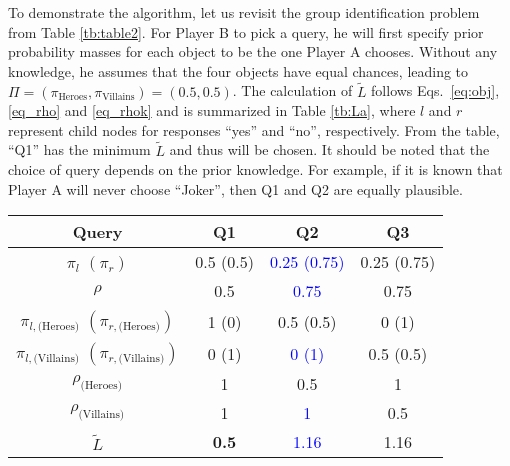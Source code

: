 \documentclass[onecolumn,11pt]{article}
\newcommand{\highlight}[1]{{\textcolor{blue}{{#1}}}}
\newcommand{\highlight}[1]{{{#1}}}
\newcommand{\cutsubsectionup}{\vspace*{-0.09in}}
\newcommand{\cutsubsectionup}{}
\begin{document}
To demonstrate the algorithm, let us revisit the group identification
problem from Table \ref{tb:table2}. For Player B to pick a query, he will first specify prior probability masses for each object to be the one Player A chooses.
Without any knowledge, he assumes that the four objects have equal chances, leading to $\Pi=(\pi_{\text{Heroes}},\pi_{\text{Villains}})=(0.5,0.5)$. The calculation of $\tilde{L}$ follows Eqs.~\eqref{eq:obj}, \eqref{eq_rho} and \eqref{eq_rhok} and is summarized in Table \ref{tb:La}, where $l$ and $r$ represent child nodes for responses ``yes'' and ``no'', respectively. From the table, ``Q1'' has the minimum $\tilde{L}$ and thus will be chosen. It should be noted that the choice of query depends on the prior knowledge. For example, if it is known that Player A will never choose ``Joker'', then Q1 and Q2 are equally plausible.
\begin{table*}[ht!]
\centering
\caption{Query selection for the case in Table \ref{tb:table2}} {\small
\begin{tabular*}{0.9\linewidth}{cccc}
\hline
Query & Q1 & Q2 & Q3 \\
\hline
$\pi_{l}$ $\left(\pi_{r}\right)$ & 0.5 (0.5) & \highlight{0.25 (0.75)} & 0.25 (0.75) \\
$\rho$ & 0.5 & \highlight{0.75} & 0.75 \\
$\pi_{l,\text{(Heroes)}}$ $\left(\pi_{r,\text{(Heroes)}}\right)$ & 1 (0) & 0.5 (0.5) & 0 (1) \\
$\pi_{l,\text{(Villains)}}$ $\left(\pi_{r,\text{(Villains)}}\right)$ & 0 (1) & \highlight{0 (1)} & 0.5 (0.5) \\
$\rho_{\text{(Heroes)}}$ & 1 & 0.5 & 1 \\
$\rho_{\text{(Villains)}}$ & 1 & \highlight{1} & 0.5 \\
$\tilde{L}$ & {\bf 0.5} & \highlight{1.16} & 1.16 \\
\hline
\end{tabular*}
}
\label{tb:La}
\end{table*}

\cutsubsectionup
\end{document}
